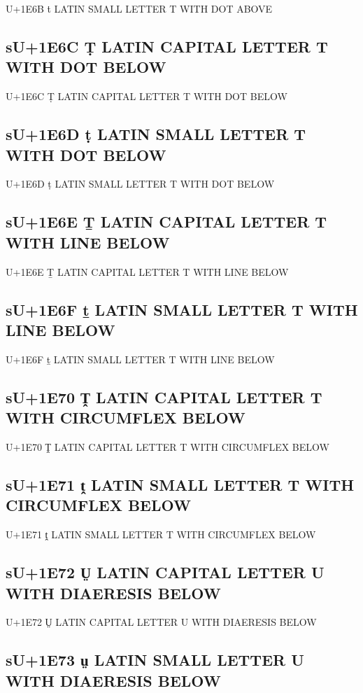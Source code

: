 U+1E6B ṫ LATIN SMALL LETTER T WITH DOT ABOVE

\subsection{sU+1E6C Ṭ LATIN CAPITAL LETTER T WITH DOT BELOW}

U+1E6C Ṭ LATIN CAPITAL LETTER T WITH DOT BELOW

\subsection{sU+1E6D ṭ LATIN SMALL LETTER T WITH DOT BELOW}

U+1E6D ṭ LATIN SMALL LETTER T WITH DOT BELOW

\subsection{sU+1E6E Ṯ LATIN CAPITAL LETTER T WITH LINE BELOW}

U+1E6E Ṯ LATIN CAPITAL LETTER T WITH LINE BELOW

\subsection{sU+1E6F ṯ LATIN SMALL LETTER T WITH LINE BELOW}

U+1E6F ṯ LATIN SMALL LETTER T WITH LINE BELOW

\subsection{sU+1E70 Ṱ LATIN CAPITAL LETTER T WITH CIRCUMFLEX BELOW}

U+1E70 Ṱ LATIN CAPITAL LETTER T WITH CIRCUMFLEX BELOW

\subsection{sU+1E71 ṱ LATIN SMALL LETTER T WITH CIRCUMFLEX BELOW}

U+1E71 ṱ LATIN SMALL LETTER T WITH CIRCUMFLEX BELOW

\subsection{sU+1E72 Ṳ LATIN CAPITAL LETTER U WITH DIAERESIS BELOW}

U+1E72 Ṳ LATIN CAPITAL LETTER U WITH DIAERESIS BELOW

\subsection{sU+1E73 ṳ LATIN SMALL LETTER U WITH DIAERESIS BELOW}

